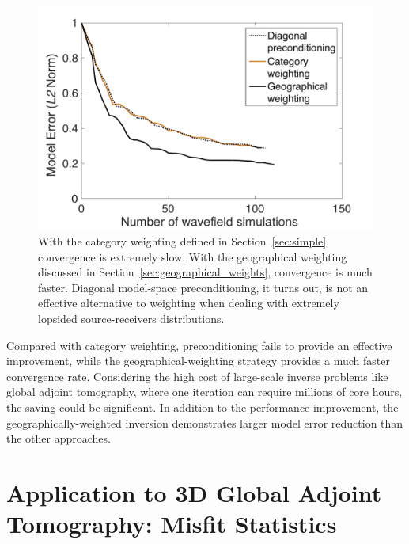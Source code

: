 \begin{figure}
    \centering
    \begin{minipage}[t]{.9\columnwidth}
    \includegraphics[width=.8\textwidth]{ch-weighting/figures/convergence_tests.pdf}  %
    \end{minipage}
  \caption[Convergence Test for different weighting strategies]
  {\small{With the category weighting defined in Section~\ref{sec:simple}, convergence is extremely slow.  
With the geographical weighting discussed in Section~\ref{sec:geographical_weights}, convergence is much faster.  
Diagonal model-space preconditioning, it turns out, is not an effective alternative to weighting when dealing with extremely lopsided source-receivers distributions.
}}
\label{fig:convergence}
\end{figure}

Compared with category weighting, preconditioning fails to provide an effective improvement, while the geographical-weighting 
strategy provides a much faster convergence rate. Considering the high cost of large-scale inverse problems 
like global adjoint tomography, where one iteration can require  millions of core hours, 
the saving could be significant. In addition to the performance improvement, the geographically-weighted inversion 
 demonstrates larger model error reduction than the other  approaches. 
%
%
\section{Application to 3D Global Adjoint Tomography: Misfit Statistics}

